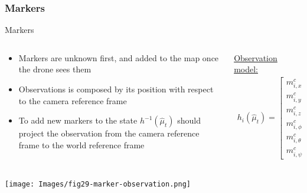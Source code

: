 \documentclass[serif,aspectratio=169]{beamer}
\begin{document}
    \subsubsection{Markers}
    \begin{frame}{Markers}
        \begin{columns}[c]
            \begin{column}{.5\textwidth}
                \begin{itemize}
                    \item{Markers are unknown first, and added to the map once the drone sees them}
                    \item{Observations is composed by its position with respect to the camera reference frame}
                    \item{To add new markers to the state $h^{-1}\left(\hat\mu_t\right)$ should project the observation from the camera reference frame to the world reference frame}
                \end{itemize}
            \end{column}
            \begin{column}{.5\textwidth}
                \underline{Observation model:}
                 \begin{align*}
                    h_i(\hat\mu_t) = \begin{bmatrix}
                            m_{i, x}^c \\ m_{i, y}^c \\ m_{i, z}^c \\ m_{i, \phi}^c \\ m_{i, \theta}^c \\ m_{i, \psi}^c
                        \end{bmatrix} = (\bm{T_r} * \bm{T_c})^{-1} * \bm{T_m}
                \end{align*}
            \end{column}
        \end{columns}
    \end{frame}

    \begin{frame}
        \centering
        \texttt{[image: Images/fig29-marker-observation.png]}
    \end{frame}
\end{document}
